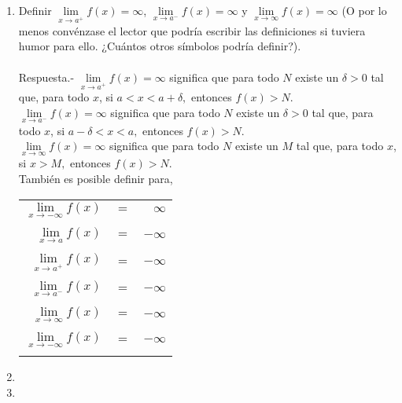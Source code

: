 \begin{enumerate}
\begin{enumerate}[\bfseries (a)]
	\item Definir $\lim\limits_{x\to a^+} f(x) =\infty$, $\lim\limits_{x\to a^-} f(x) = \infty$ y $\lim\limits_{x\to \infty} f(x) = \infty$ (O por lo menos convénzase el lector que podría escribir las definiciones si tuviera humor para ello. ¿Cuántos otros símbolos podría definir?).\\\\
	    Respuesta.-\; $\lim\limits_{x\to a^+} f(x) = \infty $ significa que para todo $N$ existe un $\delta > 0$ tal que, para todo $x$, si $a<x<a+\delta,$ entonces $f(x)>N$.\\
	     $\lim\limits_{x\to a^-} f(x) = \infty $ significa que para todo $N$ existe un $\delta > 0$ tal que, para todo $x$, si $a-\delta<x<a,$ entonces $f(x)>N$.\\
	     $\lim\limits_{x\to \infty} f(x) = \infty $ significa que para todo $N$ existe un $M$ tal que, para todo $x$, si $x>M,$ entonces $f(x)>N$.\\
	     También es posible definir para,
	     \begin{center}
		 \begin{tabular}{rcr}
		     $\lim\limits_{x\to -\infty} f(x)$&$=$&$\infty$\\\\
		     $\lim\limits_{x\to a} f(x)$&$=$&$-\infty$\\\\
		     $\lim\limits_{x\to a^+} f(x)$&$=$&$-\infty$\\\\
		     $\lim\limits_{x\to a^-} f(x)$&$=$&$-\infty$\\\\
		     $\lim\limits_{x\to \infty} f(x)$&$=$&$-\infty$\\\\
		     $\lim\limits_{x\to -\infty} f(x)$&$=$&$-\infty$\\\\
		 \end{tabular}
	     \end{center}

		

	\item 

	\item 

    \end{enumerate}

\end{enumerate} 
